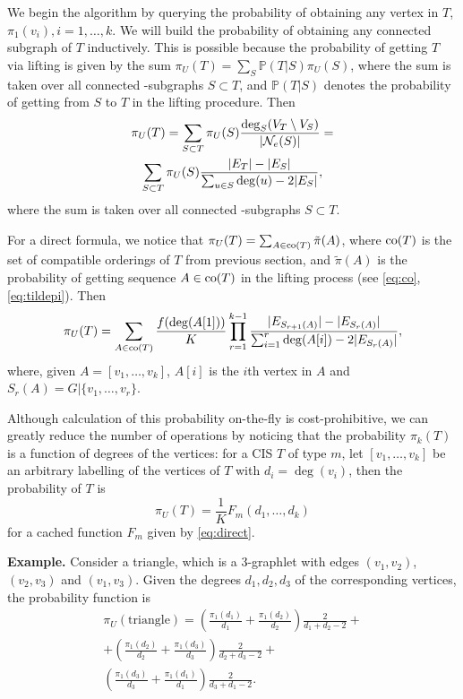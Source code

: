 	We begin the algorithm by querying the probability of obtaining any vertex in $T$, $\pi_1(v_i), i=1,\ldots,k$.
	We will build the probability of obtaining any connected subgraph of $T$ inductively.
	This is possible because the probability of getting $T$ via lifting is given by the sum $\pi_U(T) = \sum_S \mathbb{P}(T|S) \pi_{U}(S)$, where the sum is taken over all connected -subgraphs $S\subset T$, and $\mathbb{P}(T|S)$ denotes the probability of getting from $S$ to $T$ in the lifting procedure.
	Then
	\begin{multline}
	\label{eq:recursive}
		\pi_{U}(T) = \sum_{S\subset T} \pi_{U}(S) \frac{\mathrm{deg}_S (V_T\setminus V_S)}{|\mathcal{N}_e(S)|} = \\
		\sum_{S\subset T} \pi_{U}(S) \frac{|E_T| - |E_S|}
		{\sum_{u\in S} \mathrm{deg}(u) - 2|E_S|},
	\end{multline}
	where the sum is taken over all connected -subgraphs $S\subset T$.
	
	For a direct formula, we notice that $\pi_U(T) = \sum_{A\in \mathrm{co}(T)} \tilde\pi(A)$, where $\mathrm{co}(T)$ is the set of compatible orderings of $T$ from previous section, and $\tilde\pi(A)$ is the probability of getting sequence $A\in \mathrm{co}(T)$ in the lifting process (see \eqref{eq:co},\eqref{eq:tildepi}).
	Then 
	\begin{equation}
	\label{eq:direct}
		\pi_U(T) = \sum_{A\in\mathrm{co}(T)} \frac{f(\mathrm{deg}(A[1]))}{K} \prod_{r=1}^{k-1} \frac{|E_{S_{r+1}(A)}| - |E_{S_r(A)}|}{\sum_{i=1}^r \mathrm{deg}(A[i]) - 2|E_{S_r(A)}|},
	\end{equation}
	where, given $A=[v_1,\ldots,v_k]$, $A[i]$ is the $i$th vertex in $A$ and $S_r(A) = G|\{v_1,\ldots,v_r\}$.
	
	Although calculation of this probability on-the-fly is cost-prohibitive, we can greatly reduce the number of operations by noticing that the probability $\pi_k(T)$ is a 
	function of degrees of the vertices: for a CIS $T$ of type $m$, let $[v_1, \ldots, v_k]$ be an arbitrary labelling of the vertices of $T$ with $d_i = \deg(v_i)$, then the probability of $T$ is
	\begin{equation*}
	    \pi_U(T) =\frac{1}{K} F_m(d_1, \ldots, d_k)
	\end{equation*}
    for a cached function $F_m$ given by \eqref{eq:direct}.
	
	\textbf{Example.} Consider a triangle, which is a 3-graphlet with edges $(v_1,v_2)$, 
	$(v_2, v_3)$ and $(v_1,v_3)$. Given the degrees $d_1, d_2, d_3$ of the corresponding 
	vertices, the probability function is
	\begin{multline}
	\label{prob:triangle}
		\pi_U(\mathrm{triangle}) = \left( \frac{\pi_1(d_1)}{d_1} + 
		\frac{\pi_1(d_2)}{d_2}\right) \frac{2}{d_1+d_2-2} +\\ 
		+ \left( \frac{\pi_1(d_2)}{d_2} + \frac{\pi_1(d_3)}{d_3}\right) 
		\frac{2}{d_2+d_3-2} +\\
		\left( \frac{\pi_1(d_3)}{d_3} + \frac{\pi_1(d_1)}{d_1}\right) 
		\frac{2}{d_3+d_1-2}.
	\end{multline}
	
